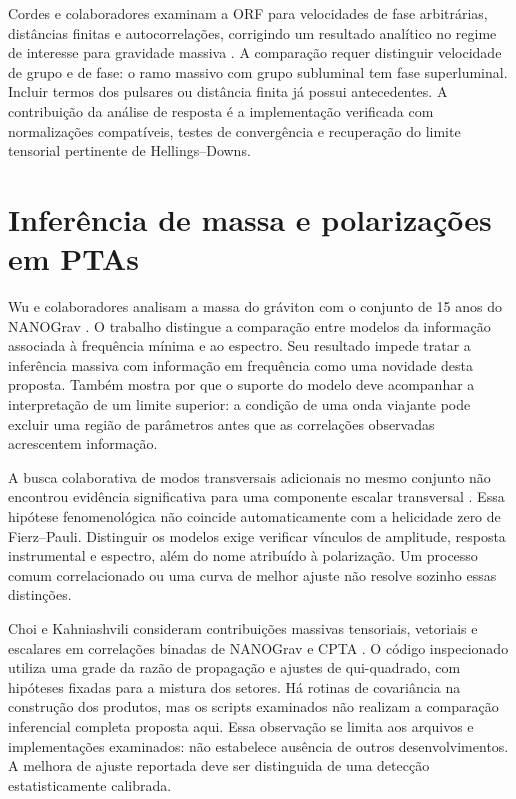 Cordes e colaboradores examinam a ORF para velocidades de fase
arbitrárias, distâncias finitas e autocorrelações, corrigindo um
resultado analítico no regime de interesse para gravidade massiva
\autocite{cordes2025}. A comparação requer distinguir velocidade de
grupo e de fase: o ramo massivo com grupo subluminal tem fase
superluminal. Incluir termos dos pulsares ou distância finita já possui
antecedentes. A contribuição da análise de resposta é a implementação verificada
com normalizações compatíveis, testes de convergência e recuperação do
limite tensorial pertinente de Hellings--Downs.

\section{Inferência de massa e polarizações em PTAs}

Wu e colaboradores analisam a massa do gráviton com o conjunto de 15
anos do NANOGrav \autocite{wu2024}. O trabalho distingue a comparação
entre modelos da informação associada à frequência mínima e ao
espectro. Seu resultado impede tratar a inferência massiva com
informação em frequência como uma novidade desta proposta. Também
mostra por que o suporte do modelo deve acompanhar a interpretação de
um limite superior: a condição de uma onda viajante pode excluir uma
região de parâmetros antes que as correlações observadas acrescentem
informação.

A busca colaborativa de modos transversais adicionais no mesmo
conjunto não encontrou evidência significativa para uma componente
escalar transversal \autocite{nanograv2024}. Essa hipótese
fenomenológica não coincide automaticamente com a helicidade zero de
Fierz--Pauli. Distinguir os modelos exige verificar vínculos de
amplitude, resposta instrumental e espectro, além do nome atribuído à
polarização. Um processo comum correlacionado ou uma curva de melhor
ajuste não resolve sozinho essas distinções.

Choi e Kahniashvili consideram contribuições massivas tensoriais,
vetoriais e escalares em correlações binadas de NANOGrav e CPTA
\autocite{choi2025}. O código inspecionado utiliza uma grade da razão
de propagação e ajustes de qui-quadrado, com hipóteses fixadas para a
mistura dos setores. Há rotinas de covariância na construção dos
produtos, mas os scripts examinados não realizam a comparação
inferencial completa proposta aqui. Essa observação se limita aos
arquivos e implementações examinados: não estabelece ausência de outros
desenvolvimentos. A melhora de ajuste reportada deve ser distinguida de
uma detecção estatisticamente calibrada.

